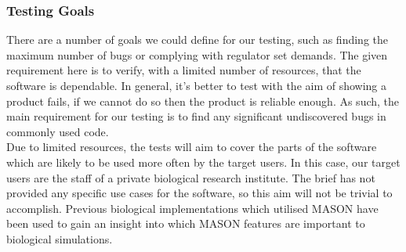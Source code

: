 \documentclass[11pt]{article}
\begin{document}


\subsubsection{Testing Goals}

There are a number of goals we could define for our testing, such as finding the maximum number of bugs or complying with regulator set demands.
The given requirement here is to verify, with a limited number of resources, that the software is dependable.
In general, it's better to test with the aim of showing a product fails, if we cannot do so then the product is reliable enough\cite[pp. 20]{lessons_book}.
As such, the main requirement for our testing is to find any significant undiscovered bugs in commonly used code.
\\


Due to limited resources, the tests will aim to cover the parts of the software which are likely to be used more often by the target users.
In this case, our target users are the staff of a private biological research institute.
The brief has not provided any specific use cases for the software, so this aim will not be trivial to accomplish.
Previous biological implementations which utilised MASON\cite{ppsim} have been used to gain an insight into which MASON features are important to biological simulations.
\\
\end{document}
